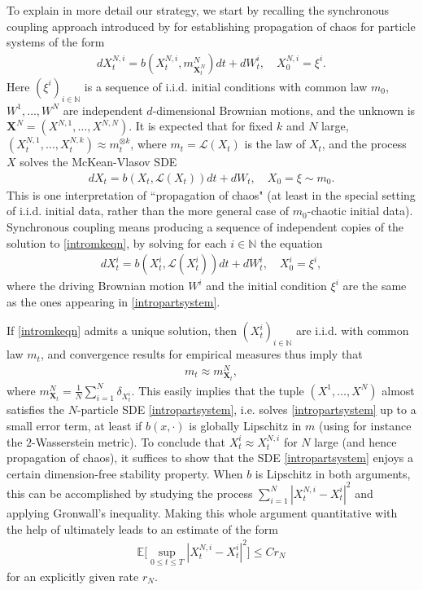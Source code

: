 \documentclass[11pt,reqno]{amsart}
\numberwithin{equation}{section}
\theoremstyle{definition}
\def\E{{\mathbb E}}
\def\N{{\mathbb N}}
\newcommand{\bX}{\mathbf{X}}
\newcommand{\sL}{\mathcal{L}}
\newcommand{\ov}{\overline}
\def \E{\mathbb{E}}
\def \N{\mathbb{N}}
\begin{document}
To explain in more detail our strategy, we start by recalling the synchronous coupling approach introduced by \citet{sznitman} for establishing propagation of chaos for particle systems of the form
\begin{align} \label{intropartsystem}
dX_t^{N,i} = b(X_t^{N,i}, m_{\bX_t^N}^N) dt + dW_t^i, \quad X_0^{N,i} = \xi^i. 
\end{align}
Here $(\xi^i)_{i \in \N}$ is a sequence of i.i.d. initial conditions with common law $m_0$, $W^1,\dots,W^N$ are independent $d$-dimensional Brownian motions, and the unknown is $\bX^N = (X^{N,1},\dots,X^{N,N})$.
 It is expected that for fixed $k$ and $N$ large, $(X_t^{N,1},\dots,X_t^{N,k}) \approx m_t^{\otimes k}$,
where $m_t = \sL(X_t)$ is the law of $X_t$, and the process $X$ solves the McKean-Vlasov SDE 
\begin{align} \label{intromkeqn}
dX_t = b(X_t, \sL(X_t)) dt + dW_t, \quad X_0 = \xi \sim m_0. 
\end{align}
This is one interpretation of ``propagation of chaos" (at least in the special setting of i.i.d. initial data, rather than the more general case of $m_0$-chaotic initial data).
Synchronous coupling means producing a sequence of independent copies of the solution to \eqref{intromkeqn}, by solving for each $i \in \N$ the equation 
\begin{align} \label{intromkeqncopies}
  dX_t^i = b(X_t^i, \sL(X_t^i)) dt + dW_t^i, \quad X_0^i = \xi^i, 
\end{align}
where the driving Brownian motion $W^i$ and the initial condition $\xi^i$ are the same as the ones appearing in \eqref{intropartsystem}.

If \eqref{intromkeqn} admits a unique solution, then $(X_t^i)_{i \in \N}$ are i.i.d. with common law $m_t$, and convergence results for empirical measures thus imply that 
\begin{align} 
  m_t \approx m_{\bX_t}^N, %
\end{align}
where $m_{\bX_t}^N = \frac{1}{N} \sum_{i = 1}^N \delta_{X_t^i}$.
This easily implies that the tuple $(X^1,\dots,X^N)$ almost satisfies the $N$-particle SDE \eqref{intropartsystem}, i.e. solves \eqref{intropartsystem} up to a small error term, at least if $ b(x,\cdot)$ is globally Lipschitz in $m$ (using for instance the $2$-Wasserstein metric). 
To conclude that $X_t^i \approx X_t^{N,i}$ for $N$ large (and hence propagation of chaos), it suffices to show that the SDE \eqref{intropartsystem} enjoys a certain dimension-free stability property. When $b$ is Lipschitz in both arguments, this can be accomplished by studying the process $\sum_{i = 1}^N |X_t^{N,i} - X_t^i|^2$ and applying Gronwall's inequality. Making this whole argument quantitative with the help of \cite[Theorem 1]{fournier2015rate} ultimately leads to an estimate of the form
\begin{align*}
\E\Big[\sup_{0 \leq t \leq T} |X_t^{N,i} - X_t^i|^2 \Big] \leq Cr_N%
\end{align*}
for an explicitly given rate $r_N$.%
\end{document}
